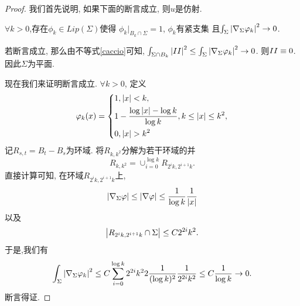 \begin{proof}
    我们首先说明, 如果下面的断言成立, 则$u$是仿射.
    \begin{claim*}
        $\forall k >0$,存在$\phi_k \in Lip(\Sigma)$使得  $\phi_k|_{B_k \cap \Sigma}=1$, $\phi_k$有紧支集 且$ \int_\Sigma \left | \nabla_\Sigma \varphi_k \right |^2 \to 0$.
    \end{claim*}
    若断言成立, 那么由不等式\eqref{caccio}可知, $\int_{\Sigma\cap B_k} \left | II \right |^2 \le \int_\Sigma \left | \nabla_\Sigma \varphi_k \right |^2 \to 0$. 则$II\equiv 0$. 因此$\Sigma$为平面. 
    \par 现在我们来证明断言成立. $\forall k>0$, 定义
    \begin{equation}
        \varphi_k(x)=\left\{
            \begin{aligned}
                &1, \left | x \right | < k, \\
                &1-\frac{\log\left | x \right |-\log k}{\log k}, k \le \left | x \right | \le k^2,\\
                &0, \left | x \right | > k^2
            \end{aligned}
        \right.
    \end{equation}
    记$R_{s,t}=B_t-B_s$为环域. 将$R_{k,k^2}$分解为若干环域的并 
    \begin{equation}
        R_{k,k^2}=\cup_{i=0}^{\log k} R_{2^ik,2^{i+1}k}.
    \end{equation}
    直接计算可知, 在环域$R_{2^ik,2^{i+1}k}$上,
    \begin{equation}
        \left | \nabla_\Sigma \varphi \right | \le \left | \nabla \varphi \right | \le \frac{1}{\log k} \frac{1}{\left | x \right |}
    \end{equation}
    以及
    \begin{equation}
        \left | R_{2^ik,2^{i+1}k} \cap \Sigma  \right | \le C 2^{2i}k^2. 
    \end{equation}
    于是,我们有
    \begin{equation}
        \int_\Sigma \left | \nabla_\Sigma \varphi_k \right |^2 \le C\sum_{i=0}^{\log k} 2^{2i}k^22\frac{1}{(\log k)^2} \frac{1}{2^{2i}k^2} \le C\frac{1}{\log k} \to 0.
    \end{equation}
    断言得证.
\end{proof}
